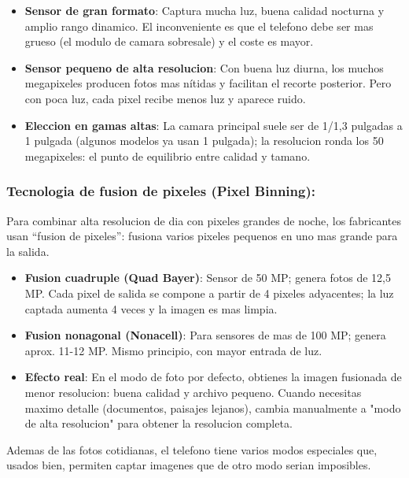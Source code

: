 \begin{itemize}
  \item \textbf{Sensor de gran formato}: Captura mucha luz, buena calidad nocturna y amplio rango dinamico. El inconveniente es que el telefono debe ser mas grueso (el modulo de camara sobresale) y el coste es mayor.
  \item \textbf{Sensor pequeno de alta resolucion}: Con buena luz diurna, los muchos megapixeles producen fotos mas nítidas y facilitan el recorte posterior. Pero con poca luz, cada pixel recibe menos luz y aparece ruido.
  \item \textbf{Eleccion en gamas altas}: La camara principal suele ser de 1/1,3 pulgadas a 1 pulgada (algunos modelos ya usan 1 pulgada); la resolucion ronda los 50 megapixeles: el punto de equilibrio entre calidad y tamano.
\end{itemize}

\subsubsection*{Tecnologia de fusion de pixeles (Pixel Binning):}

Para combinar alta resolucion de dia con pixeles grandes de noche, los fabricantes usan “fusion de pixeles”: fusiona varios pixeles pequenos en uno mas grande para la salida.

\begin{itemize}
  \item \textbf{Fusion cuadruple (Quad Bayer)}: Sensor de 50 MP; genera fotos de 12,5 MP. Cada pixel de salida se compone a partir de 4 pixeles adyacentes; la luz captada aumenta 4 veces y la imagen es mas limpia.
  \item \textbf{Fusion nonagonal (Nonacell)}: Para sensores de mas de 100 MP; genera aprox. 11-12 MP. Mismo principio, con mayor entrada de luz.
  \item \textbf{Efecto real}: En el modo de foto por defecto, obtienes la imagen fusionada de menor resolucion: buena calidad y archivo pequeno. Cuando necesitas maximo detalle (documentos, paisajes lejanos), cambia manualmente a "modo de alta resolucion" para obtener la resolucion completa.
\end{itemize}


Ademas de las fotos cotidianas, el telefono tiene varios modos especiales que, usados bien, permiten captar imagenes que de otro modo serian imposibles.

